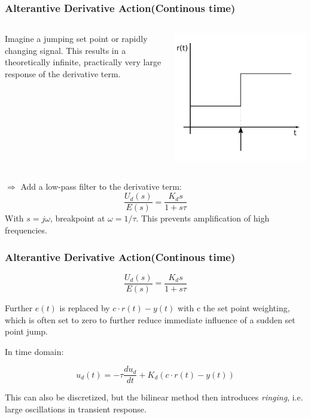 \begin{frame}
	\frametitle{Alterantive Derivative Action(Continous time)}
		\begin{columns}
			\begin{column}{0.7\linewidth}
				Imagine a jumping set point or rapidly changing signal. 
				This results in a theoretically infinite, practically very large response of
				the derivative term.  
			\end{column}
			\begin{column}{0.3\linewidth}
				\includegraphics[width=\linewidth]{img/piecewise-setpoint}
			\end{column}
		\end{columns}
		$\Rightarrow$ Add a low-pass filter to the derivative term:
		\begin{equation*}
			\frac{U_d(s)}{E(s)} = \frac{K_d s}{1+s\tau}
		\end{equation*}
		With $s=j\omega$, breakpoint at $\omega=1/\tau$. This prevents amplification of high frequencies. 
	
\end{frame}

\begin{frame}
	\frametitle{Alterantive Derivative Action(Continous time)}
	\begin{equation*}
		\frac{U_d(s)}{E(s)} = \frac{K_d s}{1+s\tau}
	\end{equation*}
	
	Further $e(t)$ is replaced by $c\cdot r(t)-y(t)$ with c the set point weighting, which is often set to zero to further reduce immediate influence of a sudden set point jump. 
	
	In time domain:
	
	\begin{equation*}
		u_d(t) = -\tau\frac{du_d}{dt} + K_d(c\cdot r(t)-y(t))
	\end{equation*}
	
	This can also be discretized, but the bilinear method then introduces \emph{ringing}, i.e. large oscillations in transient response.
\end{frame}
